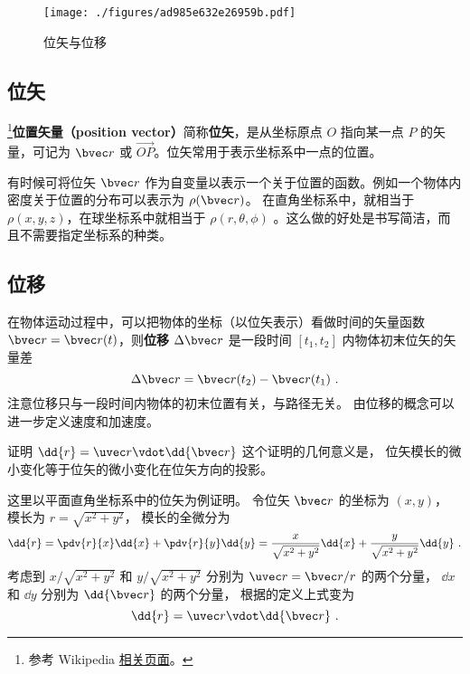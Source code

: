 

\begin{figure}[ht]
\centering
\texttt{[image: ./figures/ad985e632e26959b.pdf]}
\caption{位矢与位移} \label{fig_Disp_1}
\end{figure}

\subsection{位矢}

\footnote{参考 Wikipedia \href{https://en.wikipedia.org/wiki/Position_(geometry)}{相关页面}。}\textbf{位置矢量（position vector）}简称\textbf{位矢}，是从坐标原点 $O$ 指向某一点 $P$ 的矢量，可记为 $\bvec r$ 或 $\overrightarrow{OP}$。位矢常用于表示坐标系中一点的位置。

有时候可将位矢 $\bvec r$ 作为自变量以表示一个关于位置的函数。例如一个物体内密度关于位置的分布可以表示为 $\rho(\bvec r)$。 在直角坐标系中，就相当于 $\rho(x,y,z)$，在球坐标系中就相当于 $\rho(r,\theta,\phi)$ 。这么做的好处是书写简洁，而且不需要指定坐标系的种类。

\subsection{位移}
在物体运动过程中，可以把物体的坐标（以位矢表示）看做时间的矢量函数 $\bvec r=\bvec r(t)$，则\textbf{位移} $\Delta \bvec r$ 是一段时间 $[t_1,t_2]$ 内物体初末位矢的矢量差
\begin{equation}
\Delta \bvec r = \bvec r(t_2) - \bvec r(t_1)~.
\end{equation}
注意位移只与一段时间内物体的初末位置有关，与路径无关。 由位移的概念可以进一步定义速度和加速度。

\begin{example}{证明 $\dd{r} = \uvec r \vdot \dd{\bvec r}$}\label{ex_Disp_1}
这个证明的几何意义是， 位矢模长的微小变化等于位矢的微小变化在位矢方向的投影。

这里以平面直角坐标系中的位矢为例证明。 令位矢 $\bvec r$ 的坐标为 $(x, y)$， 模长为 $r = \sqrt{x^2 + y^2}$，
模长的全微分为
\begin{equation}
\dd{r} = \pdv{r}{x} \dd{x} + \pdv{r}{y} \dd{y} = \frac{x}{\sqrt{x^2 + y^2}} \dd{x} + \frac{y}{\sqrt{x^2 + y^2}} \dd{y}~.
\end{equation}
考虑到 $x/\sqrt{x^2 + y^2}$ 和 $y/\sqrt{x^2 + y^2}$ 分别为 $\uvec r = \bvec r/r$ 的两个分量， $\dd{x}$ 和 $\dd{y}$ 分别为 $\dd{\bvec r}$ 的两个分量， 根据的定义上式变为
\begin{equation}
\dd{r} = \uvec r \vdot \dd{\bvec r}~.
\end{equation}
\end{example}
